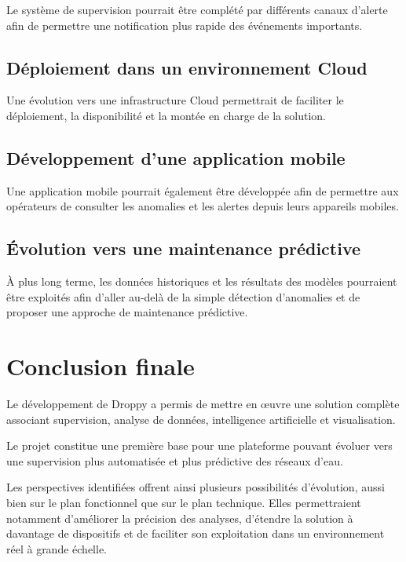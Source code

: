 Le système de supervision pourrait être complété par différents canaux
d'alerte afin de permettre une notification plus rapide des événements
importants.

\subsection{Déploiement dans un environnement Cloud}

Une évolution vers une infrastructure Cloud permettrait de faciliter le
déploiement, la disponibilité et la montée en charge de la solution.

\subsection{Développement d'une application mobile}

Une application mobile pourrait également être développée afin de permettre
aux opérateurs de consulter les anomalies et les alertes depuis leurs
appareils mobiles.

\subsection{Évolution vers une maintenance prédictive}

À plus long terme, les données historiques et les résultats des modèles
pourraient être exploités afin d'aller au-delà de la simple détection
d'anomalies et de proposer une approche de maintenance prédictive.



\section{Conclusion finale}

Le développement de Droppy a permis de mettre en œuvre une solution complète
associant supervision, analyse de données, intelligence artificielle et
visualisation.

Le projet constitue une première base pour une plateforme pouvant évoluer
vers une supervision plus automatisée et plus prédictive des réseaux d'eau.

Les perspectives identifiées offrent ainsi plusieurs possibilités
d'évolution, aussi bien sur le plan fonctionnel que sur le plan technique.
Elles permettraient notamment d'améliorer la précision des analyses,
d'étendre la solution à davantage de dispositifs et de faciliter son
exploitation dans un environnement réel à grande échelle.